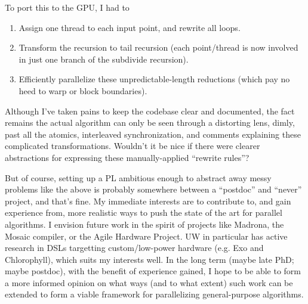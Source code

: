 To port this to the GPU, I had to
\begin{enumerate}
  \item Assign one thread to each input point, and rewrite all loops.

  \item Transform the recursion to tail recursion (each point/thread
  is now involved in just one branch of the subdivide recursion).

  \item Efficiently parallelize these unpredictable-length reductions (which pay
  no heed to warp or block boundaries).
\end{enumerate}

Although I've taken pains to keep the codebase clear and documented,
the fact remains the actual algorithm can only be seen through a
distorting lens, dimly, past all the atomics, interleaved
synchronization, and comments explaining these complicated
transformations.  Wouldn't it be nice if there were clearer
abstractions for expressing these manually-applied ``rewrite rules''?


But of course, setting up a PL ambitious enough to abstract away messy
problems like the above is probably somewhere between a ``postdoc''
and ``never'' project, and that's fine. My immediate interests are to
contribute to, and gain experience from, more realistic ways to push
the state of the art for parallel algorithms.
\ifdefined\STANFORD
I envision future work in the spirit of projects like Madrona, the
Mosaic compiler, or the Agile Hardware Project.
\fi
\ifdefined\UW
UW in particular has active research in DSLs targetting
custom/low-power hardware (e.g. Exo and Chlorophyll), which suits my
interests well.
\fi
In the long term (maybe late PhD; maybe postdoc), with the benefit of
experience gained, I hope to be able to form a more informed opinion
on what ways
\ifdefined\UW
(and to what extent)
\fi
such work can be extended to form a viable framework for
parallelizing general-purpose algorithms.



